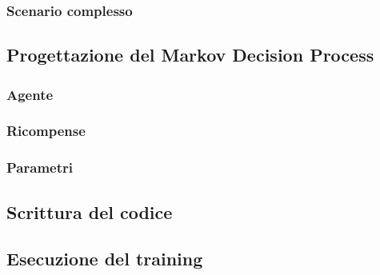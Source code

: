 \subsubsection{Scenario complesso}


\subsection{Progettazione del Markov Decision Process}
\subsubsection{Agente}


\subsubsection{Ricompense}


\subsubsection{Parametri}


\subsection{Scrittura del codice}


\subsection{Esecuzione del training}


